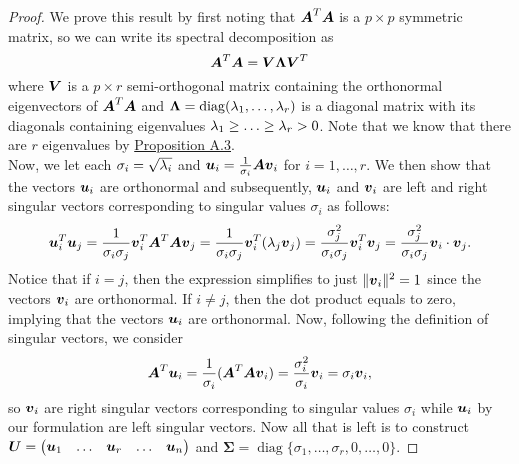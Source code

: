 \documentclass[12pt]{article}
\DeclareMathOperator{\diag}{diag}
\newcommand{\Sg}{\Sigma}
\begin{document}
	\begin{proof}
		We prove this result by first noting that $\boldsymbol{A}^T\boldsymbol{A}$ is a $p\times p$ symmetric matrix, so we can write its spectral decomposition as
		\begin{equation}
			\boldsymbol{A}^T\boldsymbol{A}=\boldsymbol{V}\boldsymbol{\Lambda}\boldsymbol{V}^T
		\end{equation}
		where $\boldsymbol{V}$ is a $p\times r$ {semi-orthogonal} matrix containing the orthonormal eigenvectors of $\boldsymbol{A}^T\boldsymbol{A}$ and $\boldsymbol{\Lambda}=\diag(\lm_1,\ldots,\lm_r)$ is a diagonal matrix with its diagonals containing eigenvalues $\lambda_1\geq\ldots\geq\lambda_r>0$. Note that we know that there are $r$ eigenvalues by \hyperref[prop1]{Proposition A.3}. \\
		
		Now, we let each $\sigma_i=\sqrt{\lambda_i}$ and $\boldsymbol{u}_i=\frac{1}{\sigma_i}\boldsymbol{A}\boldsymbol{v}_i$ for $i=1,\ldots,r$. We then show that the vectors $\boldsymbol{u}_i$ are orthonormal and subsequently, $\boldsymbol{u}_i$ and $\boldsymbol{v}_i$ are left and right singular vectors corresponding to singular values $\sigma_i$ as follows:
		\begin{align}
			\boldsymbol{u}_i^T\boldsymbol{u}_j
			=\frac{1}{\sigma_i\sigma_j}\boldsymbol{v}_i^T{\boldsymbol{A}^T\boldsymbol{A}\boldsymbol{v}_j}
			=\frac{1}{\sigma_i\sigma_j}\boldsymbol{v}_i^T({\lambda_j\boldsymbol{v}_j})
			=\frac{\sigma_j^2}{\sigma_i\sigma_j}\boldsymbol{v}_i^T\boldsymbol{v}_j
			=\frac{\sigma_j^2}{\sigma_i\sigma_j}\boldsymbol{v}_i\cdot\boldsymbol{v}_j.
		\end{align}
		Notice that if $i=j$, then the expression simplifies to just $\|\boldsymbol{v}_i\|^2=1$ since the vectors $\boldsymbol{v}_i$ are orthonormal. If $i\neq j$, then the dot product equals to zero, implying that the vectors $\boldsymbol{u}_i$ are orthonormal. Now, following the definition of singular vectors, we consider
		\begin{equation}
			\boldsymbol{A}^T{\boldsymbol{u}_i}={\frac{1}{\sigma_i}}(\boldsymbol{A}^T{\boldsymbol{A}\boldsymbol{v}_i})=\frac{{\sigma_i^2}}{\sigma_i}{\boldsymbol{v}_i}=\sigma_i\boldsymbol{v}_i,
		\end{equation}
		so $\boldsymbol{v}_i$ are right singular vectors corresponding to singular values $\sigma_i$ while $\boldsymbol{u}_i$ by our formulation are left singular vectors. Now all that is left is to construct $\boldsymbol{U}=\begin{pmatrix}
			\boldsymbol{u}_1 & \ldots & \boldsymbol{u}_r & \ldots & \boldsymbol{u}_n
		\end{pmatrix}$ and $\boldsymbol{\Sg}=\diag\{\sigma_1,\ldots,\sigma_r,0,\ldots,0\}$. 
	\end{proof}
	
\end{document}

